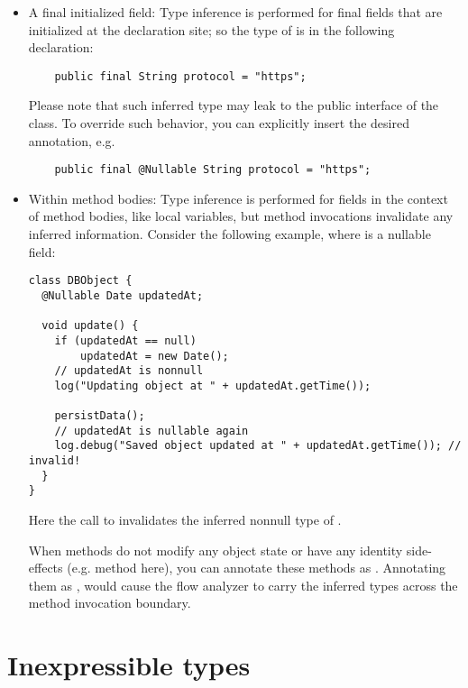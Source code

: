 \begin{itemize}

\item
A final initialized field:
Type inference is performed for final fields that
are initialized at the declaration site; so the type of  is
 in the following declaration:

\begin{Verbatim}
    public final String protocol = "https";
\end{Verbatim}

Please note that such inferred type may leak to the public interface of the
class.  To override such behavior, you can explicitly insert the desired
annotation, e.g.

\begin{Verbatim}
    public final @Nullable String protocol = "https";
\end{Verbatim}

\item
Within method bodies:
Type inference is performed for fields in the context of method bodies,
like local variables, but method invocations invalidate any inferred
information.  Consider the following example, where  is a nullable
field:

\begin{Verbatim}
class DBObject {
  @Nullable Date updatedAt;

  void update() {
    if (updatedAt == null)
        updatedAt = new Date();
    // updatedAt is nonnull
    log("Updating object at " + updatedAt.getTime());

    persistData();
    // updatedAt is nullable again
    log.debug("Saved object updated at " + updatedAt.getTime()); // invalid!
  }
}
\end{Verbatim}

Here the call to  invalidates the inferred nonnull type
of .

When methods do not modify any object state or have any identity side-effects
(e.g.  method here), you can annotate these methods as
.  Annotating them as , would cause the flow analyzer to
carry the inferred types across the method invocation boundary.

\end{itemize}

\section{Inexpressible types\label{inexpressible-types}}

